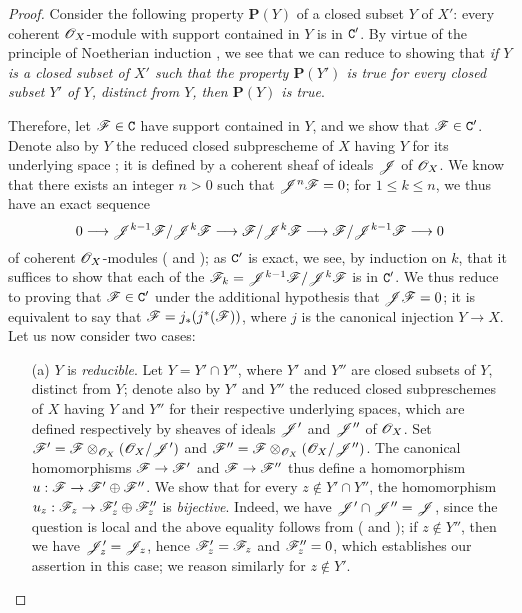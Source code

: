 \begin{proof}
\label{proof-3.3.1.2}
Consider the following property $\textbf{P}(Y)$ of a closed subset $Y$ of $X'$: every coherent $\mathscr{O}_X$-module with support contained in $Y$ is in $\mathtt{C}'$.
By virtue of the principle of Noetherian induction , we see that we can reduce to showing that \emph{if $Y$ is a closed subset of $X'$ such that the property $\textbf{P}(Y')$ is true for every closed subset $Y'$ of $Y$, distinct from $Y$, then $\textbf{P}(Y)$ is true}.

Therefore, let $\mathscr{F}\in\mathtt{C}$ have support contained in $Y$, and we show that $\mathscr{F}\in\mathtt{C}'$.
Denote also by $Y$ the reduced closed subprescheme of $X$ having $Y$ for its underlying space ; it is defined by a coherent sheaf of ideals $\mathscr{J}$ of $\mathscr{O}_X$.
We know  that there exists an integer $n>0$ such that $\mathscr{J}^n\mathscr{F}=0$; for $1\leq k\leq n$, we thus have an exact sequence
\[
  0\to\sh{J}^{k-1}\sh{F}/\sh{J}^k\sh{F}\to\sh{F}/\sh{J}^k\sh{F}\to\sh{F}/\sh{J}^{k-1}\sh{F}\to 0
\]
 of coherent $\mathscr{O}_X$-modules ( and ); as $\mathtt{C}'$ is exact, we see, by induction on $k$, that it suffices to show that each of the $\mathscr{F}_k=\mathscr{J}^{k-1}\mathscr{F}/\mathscr{J}^k\mathscr{F}$ is in $\mathtt{C}'$.
We thus reduce to proving that $\mathscr{F}\in\mathtt{C}'$ under the additional hypothesis that $\mathscr{J}\mathscr{F}=0$; it is equivalent to say that $\mathscr{F}=j_*(j^*(\mathscr{F}))$, where $j$ is the canonical injection $Y\to X$.
Let us now consider two cases:
\begin{enumerate}
  \item[(a)] $Y$ is \emph{reducible}.
    Let $Y=Y'\cap Y''$, where $Y'$ and $Y''$ are closed subsets of $Y$, distinct from $Y$; denote also by $Y'$ and $Y''$ the reduced closed subpreschemes of $X$ having $Y$ and $Y''$ for their respective underlying spaces, which are defined respectively by sheaves of ideals $\mathscr{J}'$ and $\mathscr{J}''$ of $\mathscr{O}_X$.
    Set $\mathscr{F}'=\mathscr{F}\otimes_{\mathscr{O}_X}(\mathscr{O}_X/\mathscr{J}')$ and $\mathscr{F}''=\mathscr{F}\otimes_{\mathscr{O}_X}(\mathscr{O}_X/\mathscr{J}'')$.
    The canonical homomorphisms $\sh{F}\to\sh{F}'$ and $\sh{F}\to\sh{F}''$ thus define a homomorphism $u:\sh{F}\to\sh{F}'\oplus\sh{F}''$.
    We show that for every $z\not\in Y'\cap Y''$, the homomorphism $u_z:\sh{F}_z\to\sh{F}_z'\oplus\sh{F}_z''$ is \emph{bijective}.
    Indeed, we have $\mathscr{J}'\cap\mathscr{J}''=\mathscr{J}$, since the question is local and
    the above equality follows from ( and ); if $z\not\in Y''$, then we have $\mathscr{J}_z'=\mathscr{J}_z$, hence $\mathscr{F}_z'=\mathscr{F}_z$ and $\mathscr{F}_z''=0$, which establishes our assertion in this case; we reason similarly for $z\not\in Y'$.

\end{enumerate}
\end{proof}
